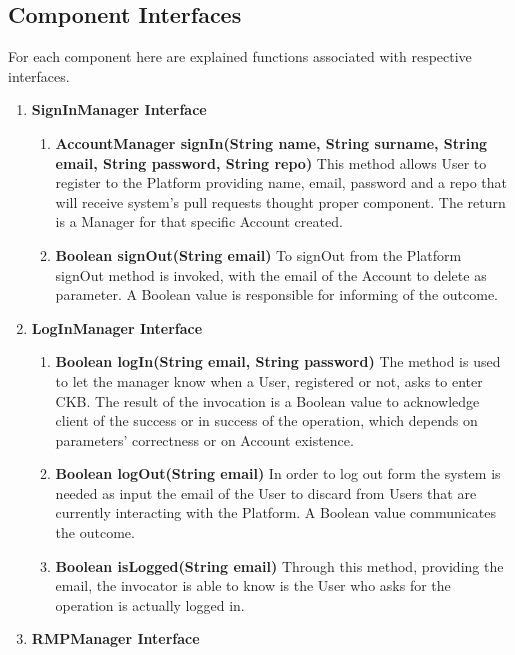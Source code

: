 \subsection{Component Interfaces}
For each component here are explained functions associated with respective interfaces.
\begin{enumerate}
    \item \textbf{SignInManager Interface} 
            \begin{enumerate}[label=$\bullet$]
                \item \textbf{AccountManager signIn(String name, String surname, String email, String password, String repo)} This method allows User to register to the Platform providing name, email, password and a repo that will 
                receive system's pull requests thought proper component. The return is a Manager for that specific Account created.
                \item \textbf{Boolean signOut(String email)} To signOut from the Platform signOut method is invoked, with the email of the Account to delete as parameter. A Boolean value is responsible for informing of the outcome.
            \end{enumerate}
    \item \textbf{LogInManager Interface}
        \begin{enumerate}[label=$\bullet$]
            \item \textbf{Boolean logIn(String email, String password)} The method is used to let the manager know when a User, registered or not, asks to enter CKB. The result of the invocation is a Boolean value to acknowledge 
            client of the success or in success of the operation, which depends on parameters' correctness or on Account existence.
            \item \textbf{Boolean logOut(String email)} In order to log out form the system is needed as input the email of the User to discard from Users that are currently interacting with the Platform. A Boolean value communicates 
            the outcome.
            \item \textbf{Boolean isLogged(String email)} Through this method, providing the email, the invocator is able to know is the User who asks for the operation is actually logged in.
        \end{enumerate}
    \item \textbf{RMPManager Interface}

\end{enumerate}
